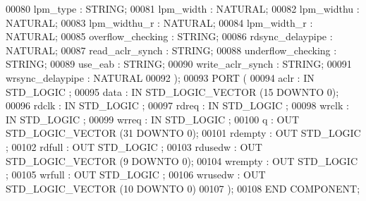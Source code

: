 \begin{DoxyCode}
{00080         lpm\_type        : \textcolor{comment}{STRING};
00081         lpm\_width       : \textcolor{comment}{NATURAL};
00082         lpm\_widthu      : \textcolor{comment}{NATURAL};
00083         lpm\_widthu\_r        : \textcolor{comment}{NATURAL};
00084         lpm\_width\_r     : \textcolor{comment}{NATURAL};
00085         overflow\_checking       : \textcolor{comment}{STRING};
00086         rdsync\_delaypipe        : \textcolor{comment}{NATURAL};
00087         read\_aclr\_synch     : \textcolor{comment}{STRING};
00088         underflow\_checking      : \textcolor{comment}{STRING};
00089         use\_eab     : \textcolor{comment}{STRING};
00090         write\_aclr\_synch        : \textcolor{comment}{STRING};
00091         wrsync\_delaypipe        : \textcolor{comment}{NATURAL}
00092     );
00093     \textcolor{keywordflow}{PORT} (
00094             aclr    : \textcolor{keywordflow}{IN} \textcolor{comment}{STD\_LOGIC} ;
00095             data    : \textcolor{keywordflow}{IN} \textcolor{comment}{STD\_LOGIC\_VECTOR} (\textcolor{vhdllogic}{}\textcolor{vhdllogic}{15} \textcolor{keywordflow}{DOWNTO} \textcolor{vhdllogic}{}\textcolor{vhdllogic}{0});
00096             rdclk   : \textcolor{keywordflow}{IN} \textcolor{comment}{STD\_LOGIC} ;
00097             rdreq   : \textcolor{keywordflow}{IN} \textcolor{comment}{STD\_LOGIC} ;
00098             wrclk   : \textcolor{keywordflow}{IN} \textcolor{comment}{STD\_LOGIC} ;
00099             wrreq   : \textcolor{keywordflow}{IN} \textcolor{comment}{STD\_LOGIC} ;
00100             q   : \textcolor{keywordflow}{OUT} \textcolor{comment}{STD\_LOGIC\_VECTOR} (\textcolor{vhdllogic}{}\textcolor{vhdllogic}{31} \textcolor{keywordflow}{DOWNTO} \textcolor{vhdllogic}{}\textcolor{vhdllogic}{0});
00101             rdempty : \textcolor{keywordflow}{OUT} \textcolor{comment}{STD\_LOGIC} ;
00102             rdfull  : \textcolor{keywordflow}{OUT} \textcolor{comment}{STD\_LOGIC} ;
00103             rdusedw : \textcolor{keywordflow}{OUT} \textcolor{comment}{STD\_LOGIC\_VECTOR} (\textcolor{vhdllogic}{}\textcolor{vhdllogic}{9} \textcolor{keywordflow}{DOWNTO} \textcolor{vhdllogic}{}\textcolor{vhdllogic}{0});
00104             wrempty : \textcolor{keywordflow}{OUT} \textcolor{comment}{STD\_LOGIC} ;
00105             wrfull  : \textcolor{keywordflow}{OUT} \textcolor{comment}{STD\_LOGIC} ;
00106             wrusedw : \textcolor{keywordflow}{OUT} \textcolor{comment}{STD\_LOGIC\_VECTOR} (\textcolor{vhdllogic}{}\textcolor{vhdllogic}{10} \textcolor{keywordflow}{DOWNTO} \textcolor{vhdllogic}{}\textcolor{vhdllogic}{0})
00107     );
00108     \textcolor{keywordflow}{END} \textcolor{keywordflow}{COMPONENT};
}
\end{DoxyCode}
